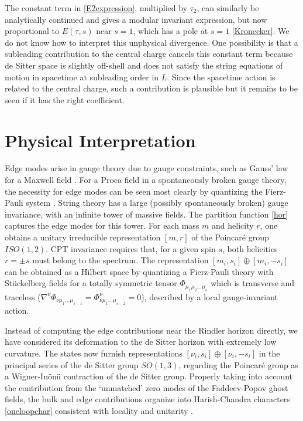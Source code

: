 \documentclass[aps,prl, reprint, superscriptaddress, 10pt]{revtex4-2}
\newcommand{\m}{\mu}
\newcommand{\1}{\textbf{1}}
\newcommand{\+}{{\,+ \,}}
\begin{document}
The constant term in \eqref{E2expression}, multiplied by $\tau_2$, can similarly be analytically continued and gives a modular invariant expression, but now proportional to $E(\tau, s)$ near $s=1$, which has a pole at $s=1$ \eqref{Kronecker}. We do not know how to interpret this unphysical divergence. One possibility is that a subleading contribution to the central charge cancels this constant term because de Sitter space is slightly off-shell and does not satisfy the string equations of motion in spacetime at subleading order in $L$. Since the spacetime action is related to the central charge, such a contribution is plausible but it remains to be seen if it has the right coefficient.

\section{Physical Interpretation} \label{sec:discussion}

Edge modes arise in gauge theory due to gauge constraints, such as Gauss' law for a Maxwell field \cite{Donnelly:2011hn,Donnelly:2014gva,Donnelly:2014fua,Donnelly:2015hxa,Ball:2024hqe}. For a Proca field in a spontaneously broken gauge theory, the necessity for edge modes can be seen most clearly by quantizing the Fierz-Pauli system \cite{Blommaert:2018rsf, Anninos:2020hfj}. String theory has a large (possibly spontaneously broken) gauge invariance, with an infinite tower of massive fields. The partition function \eqref{hor} captures the edge modes for this tower. For each mass $m$ and helicity $r$, one obtains a unitary irreducible representation $[m, r]$ of the Poincar\'e group $ISO(1,2)$. CPT invariance requires that, for a given spin $s$, both helicities $r= \pm s$ must belong to the spectrum. The representation $[m_i ,s_i]\oplus [m_i , -s_i]$ can be obtained as a Hilbert space by quantizing a Fierz-Pauli theory with St\"uckelberg fields for a totally symmetric tensor $\Phi_{\m_1\mu_2 \ldots \m_s}$ which is transverse and traceless ($\nabla^\nu \Phi_{\nu\m_1\ldots \m_{s-1}} = \Phi^\nu_{\nu\m_1\ldots \m_{s-2}} =0$), described by a local gauge-invariant action.

Instead of computing the edge contributions near the Rindler horizon directly, we have considered its deformation to the de Sitter horizon with extremely low curvature. The states now furnish representations $[\nu_i ,s_i]\oplus [\nu_i , -s_i]$ in the principal series of the de Sitter group $SO( 1, 3)$, regarding the Poincar\'e group as a Wigner-In\"on\"u contraction of the de Sitter group. Properly taking into account the contribution from the `unmatched' zero modes of the Faddeev-Popov ghost fields, the bulk and edge contributions organize into Harish-Chandra characters \eqref{oneloopchar} consistent with locality and unitarity \cite{Blommaert:2018rsf, Anninos:2020hfj}.
\end{document}
